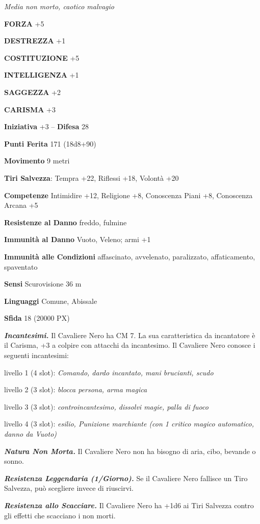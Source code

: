 \begin{multicols}{2}
	\textit{Media non morto, caotico malvagio}

	\textbf{FORZA} +5

	\textbf{DESTREZZA} +1

	\textbf{COSTITUZIONE} +5

	\textbf{INTELLIGENZA} +1

	\textbf{SAGGEZZA} +2

	\textbf{CARISMA} +3

	\textbf{Iniziativa} +3 -- \textbf{Difesa} 28

	\textbf{Punti Ferita} 171 (18d8+90)

	\textbf{Movimento} 9 metri

	\textbf{Tiri Salvezza}: Tempra +22, Riflessi +18, Volontà +20

	\textbf{Competenze} Intimidire +12, Religione +8, Conoscenza Piani +8, Conoscenza Arcana +5

	\textbf{Resistenze al Danno} freddo, fulmine

	\textbf{Immunità al Danno} Vuoto, Veleno; armi +1

	\textbf{Immunità alle Condizioni} affascinato, avvelenato, paralizzato, affaticamento, spaventato

	\textbf{Sensi} Scurovisione 36 m

	\textbf{Linguaggi} Comune, Abissale

	\textbf{Sfida} 18 (20000 PX)

	\textit{\textbf{Incantesimi.}} Il Cavaliere Nero ha CM 7. La sua caratteristica da incantatore è il Carisma, +3 a colpire con attacchi da incantesimo. Il Cavaliere Nero conosce i seguenti incantesimi:

	livello 1 (4 slot): \textit{Comando, dardo incantato, mani brucianti, scudo}

	livello 2 (3 slot): \textit{blocca persona, arma magica}

	livello 3 (3 slot): \textit{controincantesimo, dissolvi magie, palla di fuoco}

	livello 4 (3 slot): \textit{esilio, Punizione marchiante (con 1 critico magico automatico, danno da Vuoto)}

	\textit{\textbf{Natura Non Morta.}} Il Cavaliere Nero non ha bisogno di aria, cibo, bevande o sonno.

	\textit{\textbf{Resistenza Leggendaria (1/Giorno).}} Se il Cavaliere Nero fallisce un Tiro Salvezza, può scegliere invece di riuscirvi.

	\textit{\textbf{Resistenza allo Scacciare.}} Il Cavaliere Nero ha +1d6 ai Tiri Salvezza contro gli effetti che scacciano i non morti.


\end{multicols}
